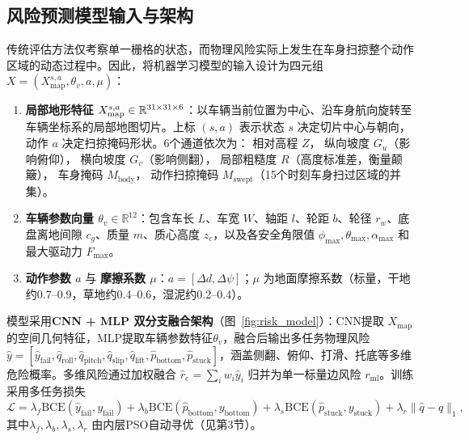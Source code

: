 \documentclass[12pt, a4paper]{article}
\begin{document}
\subsection{风险预测模型输入与架构}
传统评估方法仅考察单一栅格的状态，而物理风险实际上发生在车身扫掠整个动作区域的动态过程中。因此，将机器学习模型的输入设计为四元组 \(X = (X_{\text{map}}^{s,a}, \theta_v, a, \mu)\)：

\begin{enumerate}
    \item \textbf{局部地形特征 \(X_{\textnormal{map}}^{s,a} \in \mathbb{R}^{31 \times 31 \times 6}\)}：以车辆当前位置为中心、沿车身航向旋转至车辆坐标系的局部地图切片。上标 \((s, a)\) 表示状态 \(s\) 决定切片中心与朝向，动作 \(a\) 决定扫掠掩码形状。6个通道依次为： 相对高程 \(Z\)， 纵向坡度 \(G_u\)（影响俯仰）， 横向坡度 \(G_v\)（影响侧翻）， 局部粗糙度 \(R\)（高度标准差，衡量颠簸）， 车身掩码 \(M_{\text{body}}\)， 动作扫掠掩码 \(M_{\text{swept}}\)（15个时刻车身扫过区域的并集）。
    \item \textbf{车辆参数向量 \(\theta_v \in \mathbb{R}^{12}\)}：包含车长 \(L\)、车宽 \(W\)、轴距 \(l\)、轮距 \(b\)、轮径 \(r_w\)、底盘离地间隙 \(c_g\)、质量 \(m\)、质心高度 \(z_c\)，以及各安全角限值 \(\phi_{\max},\theta_{\max},\alpha_{\max}\) 和最大驱动力 \(F_{\max}\)。
    \item \textbf{动作参数 \(a\)} 与 \textbf{摩擦系数 \(\mu\)}：\(a = [\Delta d, \Delta \psi]\)；\(\mu\) 为地面摩擦系数（标量，干地约0.7--0.9，草地约0.4--0.6，湿泥约0.2--0.4）。
\end{enumerate}

模型采用\textbf{CNN + MLP 双分支融合架构}（图~\ref{fig:risk_model}）：CNN提取 \(X_{\text{map}}\) 的空间几何特征，MLP提取车辆参数特征$\theta_v$，融合后输出多任务物理风险 \(\hat{y} = [\hat{y}_{\text{fail}}, \hat{q}_{\text{roll}}, \hat{q}_{\text{pitch}}, \hat{q}_{\text{slip}}, \hat{q}_{\text{lift}}, \hat{p}_{\text{bottom}}, \hat{p}_{\text{stuck}}]\)，涵盖侧翻、俯仰、打滑、托底等多维危险概率。多维风险通过加权融合 \(\hat{r}_e = \sum_{i} w_i \hat{y}_i\) 归并为单一标量边风险 \(r_{\text{ml}}\)。训练采用多任务损失
\begin{equation}
\mathcal{L} = \lambda_f \text{BCE}(\hat{y}_{\text{fail}}, y_{\text{fail}}) + \lambda_b \text{BCE}(\hat{p}_{\text{bottom}}, y_{\text{bottom}}) + \lambda_s \text{BCE}(\hat{p}_{\text{stuck}}, y_{\text{stuck}}) + \lambda_r \|\hat{q} - q\|_1,
\end{equation}
其中\(\lambda_f, \lambda_b, \lambda_s, \lambda_r\) 由内层PSO自动寻优（见第3节）。
\end{document}
